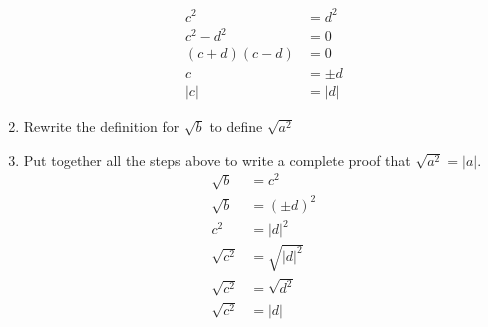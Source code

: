 \documentclass{article}
\begin{document}
\begin{enumerate}[label = \textbf{\alph*)}]
		\begin{align*}
			c^2 & = d^2 \\
			c^2 - d^2 & = 0 \\
			(c + d)(c - d) & = 0 \\
			c & = \pm d \\
			|c| & = |d|
		\end{align*}
	\item Rewrite the definition for $ \sqrt{b} $ to define $ \sqrt{ a^2 } $
	\item Put together all the steps above to write a complete proof that $ \sqrt{ a^2 } = |a| $.
		\begin{align*}
			\sqrt{ b } & = c^2 \\
			\sqrt{ b } & = (\pm d)^2 \\
			c^2 & = |d|^2 \\
			\sqrt{ c^2 } & = \sqrt{ |d|^2 } \\
			\sqrt{ c^2 } & = \sqrt{ d^2 } \\
			\sqrt{ c^2 } & = |d|
		\end{align*}
\end{enumerate}
\end{document}
